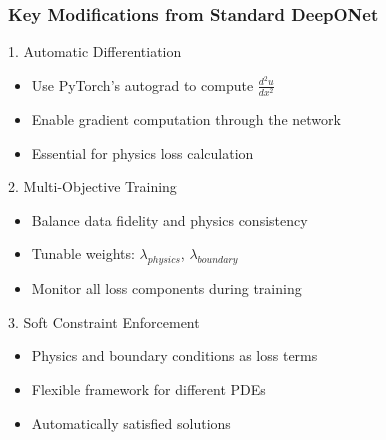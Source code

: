 \documentclass[notes]{beamer}
\begin{document}
\begin{frame}
\frametitle{Key Modifications from Standard DeepONet}

\begin{block}{1. Automatic Differentiation}
\begin{itemize}
    \item Use PyTorch's autograd to compute $\frac{d^2u}{dx^2}$
    \item Enable gradient computation through the network
    \item Essential for physics loss calculation
\end{itemize}
\end{block}

\begin{block}{2. Multi-Objective Training}
\begin{itemize}
    \item Balance data fidelity and physics consistency
    \item Tunable weights: $\lambda_{physics}$, $\lambda_{boundary}$
    \item Monitor all loss components during training
\end{itemize}
\end{block}

\begin{block}{3. Soft Constraint Enforcement}
\begin{itemize}
    \item Physics and boundary conditions as loss terms
    \item Flexible framework for different PDEs
    \item Automatically satisfied solutions
\end{itemize}
\end{block}

\end{frame}
\end{document}
